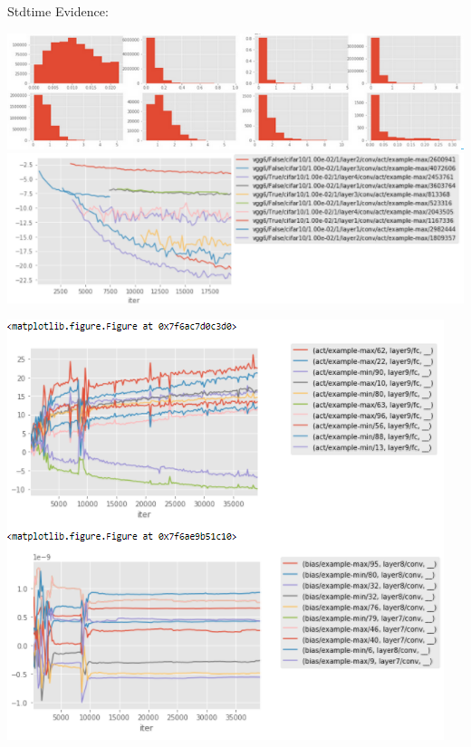 \documentclass[notes]{beamer}
\begin{document}
\begin{frame}{Stdtime}
Evidence: 

\begin{minipage}{0.49\textwidth}
\centering
\includegraphics[width=.95\textwidth]{stdtime_dist.png}\\
\includegraphics[width=.95\textwidth]{stdtime_incon.png}

\end{minipage}
\begin{minipage}{0.49\textwidth}
\includegraphics[width=.95\textwidth]{stdtime_sim.png}
\end{minipage}
\end{frame}
\end{document}
